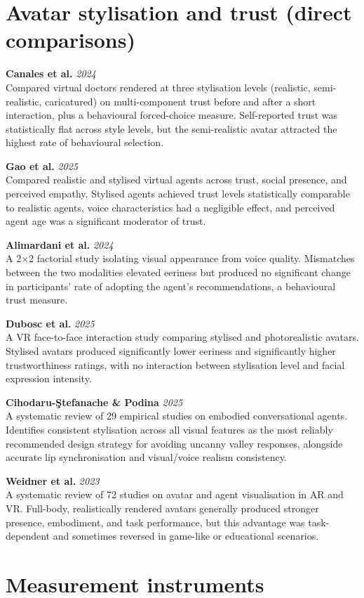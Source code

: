 \documentclass[11pt]{article}
\newcommand{\entry}[3]{%
  \noindent\textbf{#1} \hfill \textit{#2}\\
  #3
  \vspace{0.9em}
  \par
}
\begin{document}
\section*{Avatar stylisation and trust (direct comparisons)}

\entry{Canales et al.}{2024}{
Compared virtual doctors rendered at three stylisation levels (realistic, semi-realistic, caricatured) on multi-component trust before and after a short interaction, plus a behavioural forced-choice measure. Self-reported trust was statistically flat across style levels, but the semi-realistic avatar attracted the highest rate of behavioural selection.
}

\entry{Gao et al.}{2025}{
Compared realistic and stylised virtual agents across trust, social presence, and perceived empathy. Stylised agents achieved trust levels statistically comparable to realistic agents, voice characteristics had a negligible effect, and perceived agent age was a significant moderator of trust.
}

\entry{Alimardani et al.}{2024}{
A 2$\times$2 factorial study isolating visual appearance from voice quality. Mismatches between the two modalities elevated eeriness but produced no significant change in participants' rate of adopting the agent's recommendations, a behavioural trust measure.
}

\entry{Dubosc et al.}{2025}{
A VR face-to-face interaction study comparing stylised and photorealistic avatars. Stylised avatars produced significantly lower eeriness and significantly higher trustworthiness ratings, with no interaction between stylisation level and facial expression intensity.
}

\entry{Cihodaru-\c{S}tefanache \& Podina}{2025}{
A systematic review of 29 empirical studies on embodied conversational agents. Identifies consistent stylisation across all visual features as the most reliably recommended design strategy for avoiding uncanny valley responses, alongside accurate lip synchronisation and visual/voice realism consistency.
}

\entry{Weidner et al.}{2023}{
A systematic review of 72 studies on avatar and agent visualisation in AR and VR. Full-body, realistically rendered avatars generally produced stronger presence, embodiment, and task performance, but this advantage was task-dependent and sometimes reversed in game-like or educational scenarios.
}

\section*{Measurement instruments}
\end{document}
